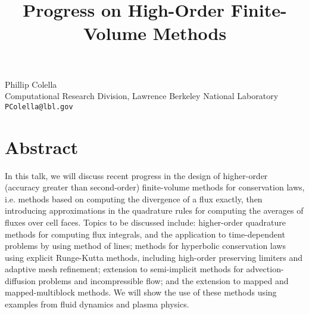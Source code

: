 \title{Progress on High-Order Finite-Volume Methods}
\author{} \institute{}
\maketitle

\begin{center}

{\large Phillip Colella}\\
Computational Research Division, Lawrence Berkeley National Laboratory \\
{\tt PColella@lbl.gov}

\end{center}

\section*{Abstract}

In this talk, we will discuss recent progress in the design of higher-order (accuracy greater than second-order) finite-volume methods for conservation laws, i.e.  methods based on computing the divergence of a flux exactly, then introducing approximations in the quadrature rules for computing the averages of fluxes over cell faces. Topics to be discussed include: higher-order quadrature methods for computing flux integrals, and the application to time-dependent problems by using method of lines; methods for hyperbolic conservation laws using explicit Runge-Kutta methods, including high-order preserving limiters and adaptive mesh refinement; extension to semi-implicit methods for advection-diffusion problems and incompressible flow; and the extension to mapped and mapped-multiblock methods. We will show the use of these methods using examples from fluid dynamics and plasma physics.